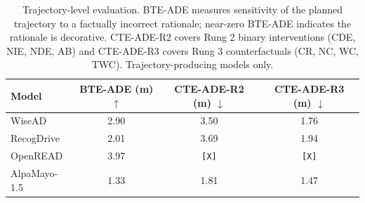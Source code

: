 \begin{table}[h!]
  \caption{Trajectory-level evaluation. BTE-ADE measures sensitivity of the planned trajectory to a factually incorrect rationale; near-zero BTE-ADE indicates the rationale is decorative. CTE-ADE-R2 covers Rung 2 binary interventions (CDE, NIE, NDE, AB) and CTE-ADE-R3 covers Rung 3 counterfactuals (CR, NC, WC, TWC). Trajectory-producing models only.}
  \label{tab:trajectory}
  \centering
  \footnotesize
  \begin{tabular}{l c c c}
    \toprule
    Model & BTE-ADE (m) $\uparrow$ & CTE-ADE-R2 (m) $\downarrow$ & CTE-ADE-R3 (m) $\downarrow$ \\
    \midrule
    WiseAD                           & 2.90 & 3.50 & 1.76 \\
    RecogDrive                       & 2.01 & 3.69 & 1.94 \\
    OpenREAD                         & 3.97 & \texttt{[X]} & \texttt{[X]} \\
    AlpaMayo-1.5                     & 1.33 & 1.81 & 1.47 \\
    \bottomrule
  \end{tabular}
\end{table}